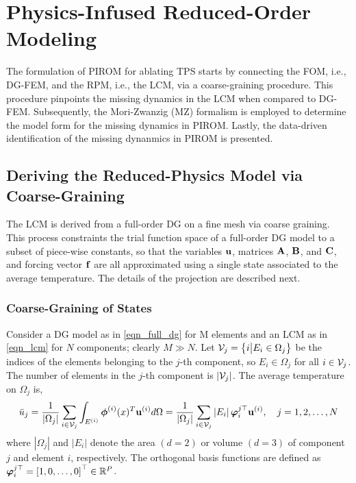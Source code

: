 \section{Physics-Infused Reduced-Order Modeling}\label{sec_pirom}
The formulation of PIROM for ablating TPS starts by connecting the FOM, i.e., DG-FEM, and the RPM, i.e., the LCM, via a coarse-graining procedure. This procedure pinpoints the missing dynamics in the LCM when compared to DG-FEM. Subsequently, the Mori-Zwanzig (MZ) formalism is employed to determine the model form for the missing dynamics in PIROM. Lastly, the data-driven identification of the missing dynanmics in PIROM is presented.

\subsection{Deriving the Reduced-Physics Model via Coarse-Graining}
The LCM is derived from a full-order DG on a fine mesh via coarse graining. This process constraints the trial function space of a full-order DG model to a subset of piece-wise constants, so that the variables $\mathbf{u}$, matrices $\mathbf{A}$, $\mathbf{B}$, and $\mathbf{C}$, and forcing vector $\mathbf{f}$ are all approximated using a single state associated to the average temperature. The details of the projection are described next.

\subsubsection{Coarse-Graining of States}

Consider a DG model as in \cref{eqn_full_dg} for M elements and an LCM as in \cref{eqn_lcm} for $N$ components; clearly $M\gg N$. Let $\mathcal{V}_j = \left\{i \big| E_i\in\Omega_j\right\}$ be the indices of the elements belonging to the $j$-th component, so $E_i\in\Omega_j$ for all $i\in \mathcal{V}_j$. The number of elements in the $j$-th component is $|\mathcal{V}_j|$. The average temperature on $\Omega_j$ is,
\begin{equation}
    \bar{u}_j = \frac{1}{|\Omega_j|}\sum_{i\in\mathcal{V}_j}\int_{E^{(i)}} \boldsymbol{\phi}^{(i)}(x)^T\mathbf{u}^{(i)} d\Omega = \frac{1}{\left|\Omega_j\right|}\sum_{i\in\mathcal{V}_j} \left|E_i\right|\boldsymbol{\varphi}_i^{j\top}\mathbf{u}^{(i)},\quad j=1,2,\dots,N\label{eqn_average_temperature}
\end{equation}
where $\left|\Omega_j\right|$ and $\left|E_i\right|$ denote the area $(d=2)$ or volume $(d=3)$ of component $j$ and element $i$, respectively. The orthogonal basis functions are defined as $\boldsymbol{\varphi}_i^{j\top} = \left[1,0,\dots,0\right]^{\top}\in\mathbb{R}^{P}$.

